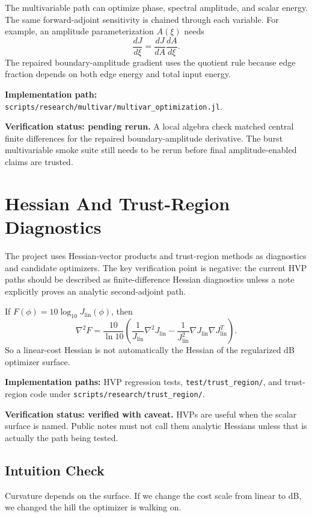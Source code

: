 \documentclass[11pt]{article}
\newcommand{\Jlin}{J_{\mathrm{lin}}}
\begin{document}
The multivariable path can optimize phase, spectral amplitude, and scalar
energy. The same forward-adjoint sensitivity is chained through each variable.
For example, an amplitude parameterization \(A(\xi)\) needs
\[
    \frac{dJ}{d\xi}
    =
    \frac{dJ}{dA}\frac{dA}{d\xi}.
\]
The repaired boundary-amplitude gradient uses the quotient rule because edge
fraction depends on both edge energy and total input energy.

\textbf{Implementation path:}
\texttt{scripts/research/multivar/multivar\_optimization.jl}.

\textbf{Verification status: pending rerun.} A local algebra check matched
central finite differences for the repaired boundary-amplitude derivative.
The burst multivariable smoke suite still needs to be rerun before final
amplitude-enabled claims are trusted.

\section{Hessian And Trust-Region Diagnostics}

The project uses Hessian-vector products and trust-region methods as
diagnostics and candidate optimizers. The key verification point is negative:
the current HVP paths should be described as finite-difference Hessian
diagnostics unless a note explicitly proves an analytic second-adjoint path.

If \(F(\phi)=10\log_{10}\Jlin(\phi)\), then
\[
    \nabla^2F
    =
    \frac{10}{\ln 10}
    \left(
      \frac{1}{\Jlin}\nabla^2\Jlin
      -
      \frac{1}{\Jlin^2}\nabla\Jlin\nabla\Jlin^T
    \right).
\]
So a linear-cost Hessian is not automatically the Hessian of the regularized
dB optimizer surface.

\textbf{Implementation paths:}
HVP regression tests, \texttt{test/trust\_region/}, and trust-region code under
\texttt{scripts/research/trust\_region/}.

\textbf{Verification status: verified with caveat.} HVPs are useful when the
scalar surface is named. Public notes must not call them analytic Hessians
unless that is actually the path being tested.

\subsection*{Intuition Check}

Curvature depends on the surface. If we change the cost scale from linear to
dB, we changed the hill the optimizer is walking on.
\end{document}
